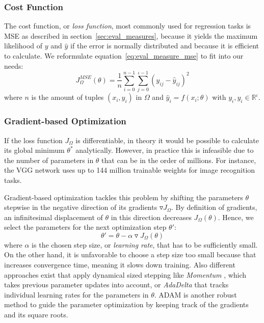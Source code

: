 \subsubsection{Cost Function}
\label{subsec:cost_function}
The cost function, or \textit{loss function}, most commonly used for regression tasks is \acf{MSE} as described in section~\ref{sec:eval_measures}, because it yields the maximum likelihood of $y$ and $\hat{y}$ if the error is normally distributed and because it is efficient to calculate. We reformulate equation~\eqref{eq:eval_measure_mse} to fit into our needs:
\begin{equation}
J^{MSE}_\Omega(\theta) = \frac{1}{n}\sum_{i=0}^{n-1}\sum_{j=0}^{\iota-1}(y_{ij}-\hat{y}_{ij})^2 \label{eq:j_mse}
\end{equation}
where $n$ is the amount of tuples $(x_i, y_i)$ in $\Omega$ and $\hat{y}_i = f(x_i;\theta)$ with $y_i, \hat{y_i} \in \mathbb{R}^\iota$. %

\subsubsection{Gradient-based Optimization} \label{subsec:gradient_optimization}
If the loss function $J_\Omega$ is differentiable, in theory it would be possible to calculate its global minimum $\theta^*$ analytically. However, in practice this is infeasible due to the number of parameters in $\theta$ that can be in the order of millions. For instance, the VGG network \autocite{simonyan_very_2014} uses up to 144 million trainable weights for image recognition tasks.

Gradient-based optimization  tackles this problem by shifting the parameters $\theta$ stepwise in the negative direction of its gradients $\triangledown J_\Omega$. By definition of gradients, an infinitesimal displacement of $\theta$ in this direction decreases $J_\Omega(\theta)$. Hence, we select the parameters for the next optimization step $\theta'$:
\begin{equation}
\theta' = \theta - \alpha\triangledown J_\Omega(\theta)
\end{equation}
where $\alpha$ is the chosen step size, or \textit{learning rate}, that has to be sufficiently small. On the other hand, it is unfavorable to choose a step size too small because that increases convergence time, meaning it slows down training. Also different approaches exist that apply dynamical sized stepping like \textit{Momentum} \autocite{polyak_methods_1964}, which takes previous parameter updates into account, or \textit{AdaDelta} \autocite{zeiler_adadelta_2012} that tracks individual learning rates for the parameters in $\theta$. ADAM \autocite{kingma_adam_2014} is another robust method to guide the parameter optimization by keeping track of the gradients and its square roots.   

